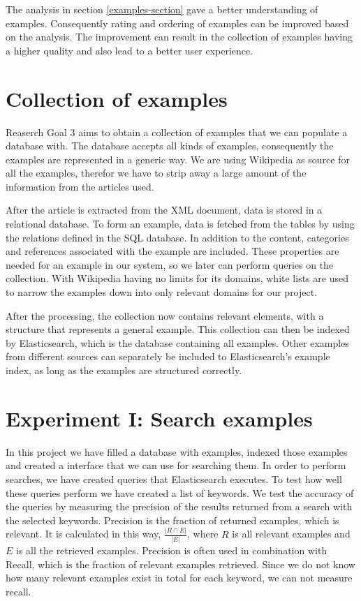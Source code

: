 The analysis in section \ref{examples-section} gave a better understanding of examples. Consequently rating and ordering of examples can be improved based on the analysis. 
The improvement can result in the collection of examples having a higher quality and also lead to a better user experience. 


\section{Collection of examples}
Reaserch Goal 3 aims to obtain a collection of examples that we can populate a database with. The database accepts all kinds of examples, consequently the examples are represented in a generic way. We are using Wikipedia as source for all the examples, therefor we have to strip away a large amount of the information from the articles used. 

After the article is extracted from the XML document, data is stored in a relational database. To form an example, data is fetched from the tables by using the relations defined in the SQL database. In addition to the content, categories and references associated with the example are included. These properties are needed for an example in our system, so we later can perform queries on the collection. With Wikipedia having no limits for its domains, white lists are used to narrow the examples down into only relevant domains for our project.

After the processing, the collection now contains relevant elements, with a structure that represents a general example. This collection can then be indexed by Elasticsearch, which is the database containing all examples. Other examples from different sources can separately be included to Elasticsearch's example index, as long as the examples are structured correctly.


\section{Experiment I: Search examples} \label{search_experiment}
In this project we have filled a database with examples, indexed those examples and created a interface that we can use for searching them. In order to perform searches, we have created queries that Elasticsearch executes. To test how well these queries perform we have created a list of keywords. We test the accuracy of the queries by measuring the precision of the results returned from a search with the selected  keywords. Precision is the fraction of returned examples, which is relevant. It is calculated in this way, \(\frac{|R \cap E |}{|E|}\), where \(R\) is all relevant examples and \(E\) is all the retrieved examples. Precision is often used in combination with Recall, which is the fraction of relevant examples retrieved. Since we do not know how many relevant examples exist in total for each keyword, we can not measure recall. 


